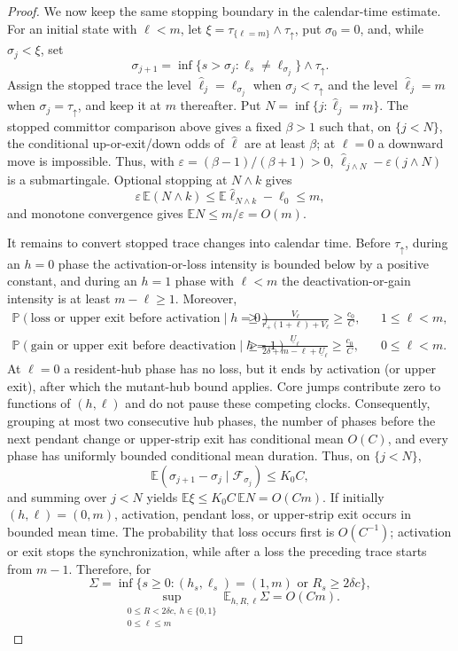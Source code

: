 \documentclass[11pt]{article}
\theoremstyle{definition}
\theoremstyle{remark}
\newcommand{\Prob}{\mathbb P}
\begin{document}
\begin{proof}
We now keep the same stopping boundary in the calendar-time estimate.  For an
initial state with $\ell<m$, let
$\xi=\tau_{\{\ell=m\}}\wedge\tau_\uparrow$, put $\sigma_0=0$, and, while
$\sigma_j<\xi$, set
\[
 \sigma_{j+1}
 =\inf\{s>\sigma_j:\ell_s\ne\ell_{\sigma_j}\}\wedge\tau_\uparrow.
\]
Assign the stopped trace the level
$\widehat\ell_j=\ell_{\sigma_j}$ when $\sigma_j<\tau_\uparrow$ and the level
$\widehat\ell_j=m$ when $\sigma_j=\tau_\uparrow$, and keep it at $m$
thereafter.  Put $N=\inf\{j:\widehat\ell_j=m\}$.  The stopped committor
comparison above gives a fixed $\beta>1$ such that, on $\{j<N\}$, the
conditional up-or-exit/down odds of $\widehat\ell$ are at least $\beta$; at
$\ell=0$ a downward move is impossible.  Thus, with
$\varepsilon=(\beta-1)/(\beta+1)>0$,
$\widehat\ell_{j\wedge N}-\varepsilon(j\wedge N)$ is a submartingale.
Optional stopping at $N\wedge k$ gives
\[
 \varepsilon\,\mathbb E(N\wedge k)
 \leq\mathbb E\widehat\ell_{N\wedge k}-\ell_0\leq m,
\]
and monotone convergence gives $\mathbb EN\leq m/\varepsilon=O(m)$.

It remains to convert stopped trace changes into calendar time.  Before
$\tau_\uparrow$, during an $h=0$ phase the activation-or-loss intensity is
bounded below by a positive constant, and during an $h=1$ phase with
$\ell<m$ the deactivation-or-gain intensity is at least
$m-\ell\geq1$.  Moreover,
\begin{align*}
 \Prob(\text{loss or upper exit before activation}\mid h=0)
 &\geq \frac{V_\ell}{r_+(1+\ell)+V_\ell}\geq\frac{c_0}{C},
 &&1\leq\ell<m,\\
 \Prob(\text{gain or upper exit before deactivation}\mid h=1)
 &\geq\frac{\underline U_\ell}
 {2\delta+m-\ell+\underline U_\ell}\geq\frac{c_0}{C},
 &&0\leq\ell<m.
\end{align*}
At $\ell=0$ a resident-hub phase has no loss, but it ends by activation (or
upper exit), after which the mutant-hub bound applies.  Core jumps contribute
zero to functions of $(h,\ell)$ and do not pause these competing clocks.
Consequently, grouping at most two consecutive hub phases, the number of
phases before the next pendant change or upper-strip exit has conditional mean
$O(C)$, and every phase has uniformly bounded conditional mean duration.
Thus, on $\{j<N\}$,
\begin{equation}
 \mathbb E(\sigma_{j+1}-\sigma_j\mid\mathcal F_{\sigma_j})
 \leq K_0C,
\label{eq:leaf-wait}
\end{equation}
and summing over $j<N$ yields
$\mathbb E\xi\leq K_0C\,\mathbb EN=O(Cm)$.  If initially
$(h,\ell)=(0,m)$, activation, pendant loss, or upper-strip exit occurs in
bounded mean time.  The probability that loss occurs first is $O(C^{-1})$;
activation or exit stops the synchronization, while after a loss the preceding
trace starts from $m-1$.  Therefore, for
\[
 \Sigma=\inf\{s\geq0:(h_s,\ell_s)=(1,m)
                         \text{ or }R_s\geq2\delta c\},
\]
\begin{equation}
 \sup_{\substack{0\leq R<2\delta c,\ h\in\{0,1\}\\0\leq\ell\leq m}}
 \mathbb E_{h,R,\ell}\Sigma=O(Cm).
\label{eq:leaf-hitting-time}
\end{equation}


\end{proof}
\end{document}
